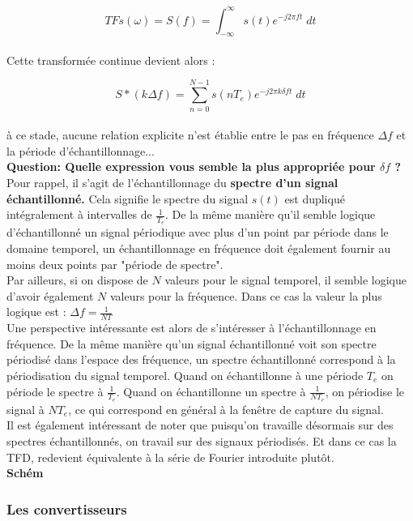 \documentclass[11pt,a4paper]{article}
\begin{document}
\[TF{s}(\omega) = S(f) = \int^{\infty}_{-\infty} s(t) e^{-j 2\pi f t} \; dt\]\\

Cette transformée continue devient alors :


\[ S*(k \Delta f) = \sum_{n = 0}^{N-1} s(nT_e) e^{-j 2\pi k \delta f t} \; dt\]\\

à ce stade, aucune relation explicite n'est établie entre le pas en fréquence $\Delta f$ et la période d'échantillonnage...\\

\textbf{Question: Quelle expression vous semble la plus appropriée pour $\delta f$ ?}\\

Pour rappel, il s'agit de l'échantillonnage du \textbf{spectre d'un signal échantillonné.} Cela signifie le spectre du signal $s(t)$ est dupliqué intégralement à intervalles de $\frac{1}{T_e}$. De la même manière qu'il semble logique d'échantillonné un signal périodique avec plus d'un point par période dans le domaine temporel, un échantillonnage en fréquence doit également fournir au moins deux points par "période de spectre".\\

Par ailleurs, si on dispose de $N$ valeurs pour le signal temporel, il semble logique d'avoir également $N$ valeurs pour la fréquence. Dans ce cas la valeur la plus logique est : $\Delta f = \frac{1}{NT}$\\

Une perspective intéressante est alors de s'intéresser à l'échantillonnage en fréquence. De la même manière qu'un signal échantillonné voit son spectre périodisé dans l'espace des fréquence, un spectre échantillonné correspond à la périodisation du signal temporel. Quand on échantillonne à une période $T_e$ on période le spectre à $\frac{1}{T_e}$. Quand on échantillonne un spectre à $\frac{1}{NT_e}$, on périodise le signal à $NT_e$, ce qui correspond en général à la fenêtre de capture du signal.\\

Il est également intéressant de noter que puisqu'on travaille désormais sur des spectres échantillonnés, on travail sur des signaux périodisés. Et dans ce cas la TFD, redevient équivalente à la série de Fourier introduite plutôt.\\


\textbf{Schém}



\subsubsection{Les convertisseurs}
\end{document}
